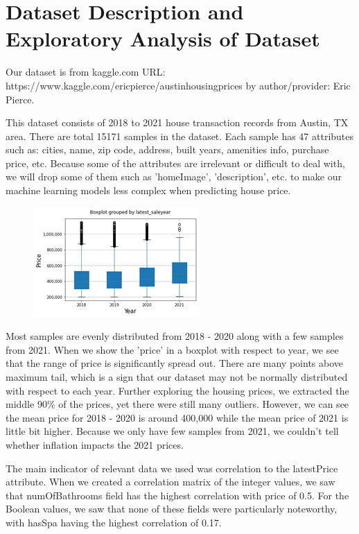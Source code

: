 \documentclass[12pt]{article}
\begin{document}
	\section{Dataset Description and Exploratory Analysis of Dataset}
	
	Our dataset is from kaggle.com URL: https://www.kaggle.com/ericpierce/austinhousingprices by author/provider: Eric Pierce.
	
	This dataset consists of 2018 to 2021 house transaction records from Austin, TX area. There are total 15171 samples in the dataset. Each sample has 47 attributes such as: cities, name, zip code, address, built years, amenities info, purchase price, etc. Because some of the attributes are irrelevant or difficult to deal with, we will drop some of them such as 'homeImage', 'description', etc. to make our machine learning models less complex when predicting house price. 
	
	\begin{figure}[H]
		\label{fig:fig1}
		\includegraphics[width=0.5\linewidth]{fig1}
	\end{figure}
	
	
	Most samples are evenly distributed from 2018 - 2020 along with a few samples from 2021. When we show the 'price' in a boxplot with respect to year, we see that the range of price is significantly spread out. There are many points above maximum tail, which is a sign that our dataset may not be normally distributed with respect to each year. Further exploring the housing prices, we extracted the middle 90\% of the prices, yet there were still many outliers. However, we can see the mean price for 2018 - 2020 is around 400,000 while the mean price of 2021 is little bit higher. Because we only have few samples from 2021, we couldn't tell whether inflation impacts the 2021 prices.
	
	The main indicator of relevant data we used was correlation to the latestPrice attribute. When we created a correlation matrix of the integer values, we saw that numOfBathrooms field has the highest correlation with price of 0.5. For the Boolean values, we saw that none of these fields were particularly noteworthy, with hasSpa having the highest correlation of 0.17.
	
\end{document}
